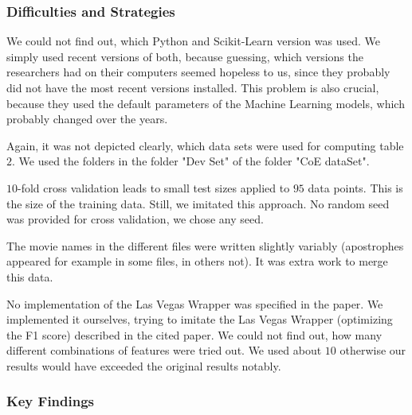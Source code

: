 \subsubsection*{Difficulties and Strategies}
We could not find out, which Python and Scikit-Learn version was used. We simply used recent versions of both, because guessing, which versions the researchers had on their computers seemed hopeless to us, since they probably did not have the most recent versions installed. This problem is also crucial, because they used the default parameters of the Machine Learning models, which probably changed over the years. 

Again, it was not depicted clearly, which data sets were used for computing table $2$. We used the folders in the folder "Dev Set" of the folder "CoE dataSet". 

$10$-fold cross validation leads to small test sizes applied to $95$ data points. This is the size of the training data. Still, we imitated this approach. No random seed was provided for cross validation, we chose any seed. 

The movie names in the different files were written slightly variably (apostrophes appeared for example in some files, in others not). It was extra work to merge this data. 

No implementation of the Las Vegas Wrapper was specified in the paper. We implemented it ourselves, trying to imitate the Las Vegas Wrapper (optimizing the F1 score) described in the cited paper. We could not find out, how many different combinations of features were tried out. We used about $10$ otherwise our results would have exceeded the original results notably. 



\subsubsection*{Key Findings}